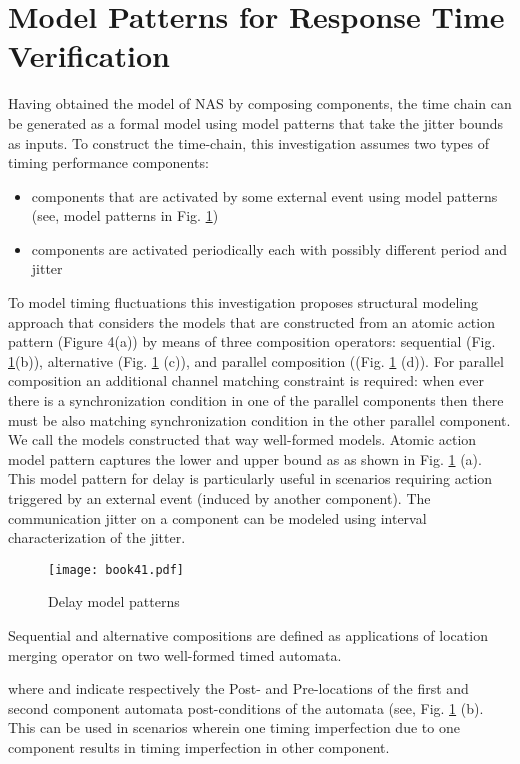 \documentclass[letterpaper, 10 pt, conference]{ieeeconf}
\begin{document}
\section{Model Patterns for Response Time Verification}
Having obtained the model of NAS by composing components, the time chain can be generated as a formal model using model patterns that take the jitter bounds as inputs. To construct the time-chain, this investigation assumes two types of timing performance components:
\begin{itemize}
	\item components that are activated by some external event using model patterns (see, model patterns in Fig. \ref{fig:ModelPattern})
	\item components are activated periodically each with possibly different period and jitter
\end{itemize}
To model timing fluctuations this investigation proposes structural modeling approach that considers the models that are constructed from an atomic action pattern (Figure 4(a)) by means of three composition operators: sequential (Fig. \ref{fig:ModelPattern}(b)), alternative  (Fig. \ref{fig:ModelPattern} (c)), and parallel composition ((Fig. \ref{fig:ModelPattern} (d)). For parallel composition an additional channel matching constraint is required: when ever there is a synchronization condition in one of the parallel components then there must be also matching synchronization condition in the other parallel component. We call the models constructed that way well-formed models. Atomic action model pattern captures the lower and upper bound as  as shown in Fig. \ref{fig:ModelPattern} (a). This model pattern for delay is particularly useful in scenarios requiring action triggered by an external event (induced by another component). The communication jitter on a component can be modeled using interval characterization of the jitter. 
\begin{figure}[h]
\centering
\texttt{[image: book41.pdf]}
\caption{Delay model patterns}
\label{fig:ModelPattern}
\end{figure}

Sequential and alternative compositions are defined as applications of location merging operator  on two well-formed timed automata.

where  and  indicate respectively the Post- and Pre-locations of the first and second component automata post-conditions of the automata (see, Fig. \ref{fig:ModelPattern} (b). This can be used in scenarios wherein one timing imperfection due to one component results in timing imperfection in other component. 
\end{document}
